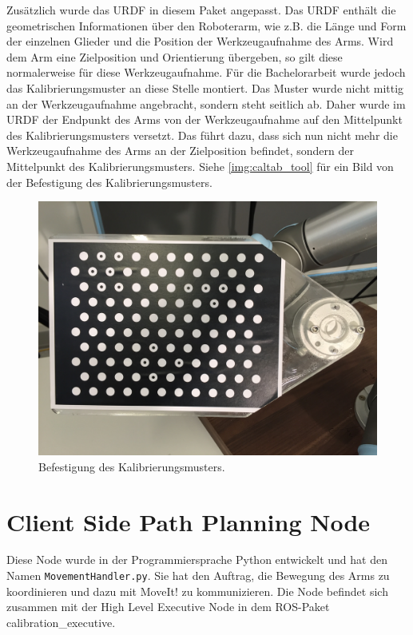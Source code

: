Zusätzlich wurde das URDF in diesem Paket angepasst. Das URDF enthält die geometrischen Informationen über den Roboterarm, wie z.B. die Länge und Form der einzelnen Glieder und die Position der Werkzeugaufnahme des Arms. Wird dem Arm eine Zielposition und Orientierung übergeben, so gilt diese normalerweise für diese Werkzeugaufnahme. Für die Bachelorarbeit wurde jedoch das Kalibrierungsmuster an diese Stelle montiert. Das Muster wurde nicht mittig an der Werkzeugaufnahme angebracht, sondern steht seitlich ab. Daher wurde im URDF der Endpunkt des Arms von der Werkzeugaufnahme auf den Mittelpunkt des Kalibrierungsmusters versetzt. Das führt dazu, dass sich nun nicht mehr die Werkzeugaufnahme des Arms an der Zielposition befindet, sondern der Mittelpunkt des Kalibrierungsmusters. Siehe \autoref{img:caltab_tool} für ein Bild von der Befestigung des Kalibrierungsmusters.
\begin{figure}
\centering
\includegraphics[width=\textwidth]{images/caltab_tool.JPG}
\caption{Befestigung des Kalibrierungsmusters.}\label{img:caltab_tool}
\end{figure}

\section{Client Side Path Planning Node} %
\label{sec:movearmserver_impl}
Diese Node wurde in der Programmiersprache Python entwickelt und hat den Namen \texttt{MovementHandler.py}. Sie hat den Auftrag, die Bewegung des Arms zu koordinieren und dazu mit MoveIt! zu kommunizieren. Die Node befindet sich zusammen mit der High Level Executive Node in dem ROS-Paket calibration\_executive.

